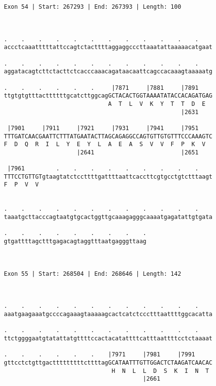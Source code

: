 \documentclass{article}
\begin{document}
\begin{Verbatim}
Exon 54 | Start: 267293 | End: 267393 | Length: 100



.    .    .    .    .    .    .    .    .    .    .    .    
accctcaaatttttattccagtctacttttaggaggcccttaaatattaaaaacatgaat
                                                            
.    .    .    .    .    .    .    .    .    .    .    .    
aggatacagtcttctacttctcacccaaacagataacaattcagccacaaagtaaaaatg
                                                            
.    .    .    .    .    .     |7871     |7881     |7891    
ttgtgtgtttacttttttgcatcttggcagGCTACACTGGTAAAATATACCACAGATGAG
                              A  T  L  V  K  Y  T  T  D  E  
                                                   |2631    
  
 |7901     |7911     |7921     |7931     |7941     |7951    
TTTGATCAACGAATTCTTTATGAATACTTAGCAGAGGCCAGTGTTGTGTTTCCCAAAGTC
F  D  Q  R  I  L  Y  E  Y  L  A  E  A  S  V  V  F  P  K  V  
                     |2641                         |2651    
  
 |7961         .    .    .    .    .    .    .    .    .    
TTTCCTGTTGTgtaagtatctccttttgattttaattcaccttcgtgcctgtctttaagt
F  P  V  V                                                  
                                                            
  
.    .    .    .    .    .    .    .    .    .    .    .    
taaatgcttacccagtaatgtgcactggttgcaaagagggcaaaatgagatattgtgata
                                                            
.    .    .    .    .    .    .    .    .
gtgattttagctttgagacagtaggtttaatgagggttaag
                                         
                                         
 
Exon 55 | Start: 268504 | End: 268646 | Length: 142



.    .    .    .    .    .    .    .    .    .    .    .    
aaatgaagaaatgccccagaaagtaaaaagcactcatctccctttaattttggcacatta
                                                            
.    .    .    .    .    .    .    .    .    .    .    .    
ttctggggaatgtatattatgttttccactacatattttcatttaattttcctctaaaat
                                                            
.    .    .    .    .    .    |7971     |7981     |7991     
gttcctctgttgactttttttttcttttagGCATAATTTGTTGGACTCTAAGATCAACAC
                               H  N  L  L  D  S  K  I  N  T 
                                        |2661               
  

\end{Verbatim}
\end{document}
